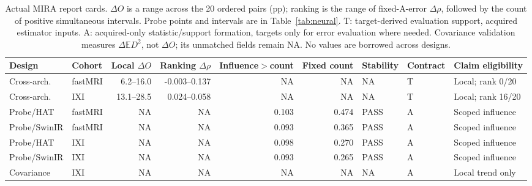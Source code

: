 \begin{table}[t]\centering\scriptsize
\caption{Actual MIRA report cards. $\Delta O$ is a range across the 20 ordered pairs (pp); ranking is the range of fixed-A-error $\Delta\rho$, followed by the count of positive simultaneous intervals. Probe points and intervals are in Table~\ref{tab:neural}. T: target-derived evaluation support, acquired estimator inputs. A: acquired-only statistic/support formation, targets only for error evaluation where needed. Covariance validation measures $\Delta\mathbb E D^2$, not $\Delta O$; its unmatched fields remain NA. No values are borrowed across designs.}
\label{tab:mira-card}\setlength{\tabcolsep}{3pt}
\begin{tabular}{llrrr rlll}\toprule
Design & Cohort & Local $\Delta O$ & Ranking $\Delta\rho$ & Influence$>$count & Fixed count & Stability & Contract & Claim eligibility\\\midrule
Cross-arch. & fastMRI & 6.2--16.0 & -0.003--0.137 & NA & NA & NA & T & Local; rank 0/20 \\
Cross-arch. & IXI & 13.1--28.5 & 0.024--0.058 & NA & NA & NA & T & Local; rank 16/20 \\
Probe/HAT & fastMRI & NA & NA & 0.103 & 0.474 & PASS & A & Scoped influence \\
Probe/SwinIR & fastMRI & NA & NA & 0.093 & 0.365 & PASS & A & Scoped influence \\
Probe/HAT & IXI & NA & NA & 0.098 & 0.270 & PASS & A & Scoped influence \\
Probe/SwinIR & IXI & NA & NA & 0.093 & 0.265 & PASS & A & Scoped influence \\
Covariance & IXI & NA & NA & NA & NA & NA & A & Local trend only \\\bottomrule\end{tabular}\end{table}